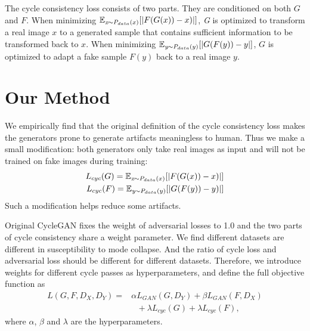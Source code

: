 \documentclass[letterpaper]{article} %
\newcommand{\zhiming}[1]{{\bf \color{blue} [Zhiming says: #1]}}
\begin{document}
	The cycle consistency loss consists of two parts. They are conditioned on both $G$ and $F$. When minimizing $\mathbb{E}_{\emph{x} \sim P_{data}(x)}[\lvert F(G(x))-x)\rvert]$, \emph{G} is optimized to transform a real image $x$ to a generated sample that contains sufficient information to be transformed back to $x$. When minimizing $\mathbb{E}_{\emph{y} \sim P_{data}(y)}[\lvert G(F(y))-y \rvert]$, $G$ is optimized to adapt a fake sample $F(y)$ back to a real image $y$. 
	
	\section{Our Method}
	
	We empirically find that the original definition of the cycle consistency loss  makes the generators prone to generate artifacts meaningless to human. Thus we make a small modification: both generators only take real images as input and will not be trained on fake images during training:
	\begin{align}
	L_{cyc}(G) = \mathbb{E}_{\emph{x} \sim P_{data}(x)}[\lvert F(G(x))-x)\rvert] \nonumber\\
	L_{cyc}(F) = \mathbb{E}_{\emph{y} \sim P_{data}(y)}[\lvert G(F(y))-y)\rvert]
	\end{align}
	Such a modification helps reduce some artifacts.
	
	Original CycleGAN fixes the weight of adversarial losses to 1.0 and the two parts of cycle consistency share a weight parameter. We find different datasets are different in susceptibility to mode collapse. And the ratio of cycle loss and adversarial loss should be different for different datasets. Therefore, we introduce weights for different cycle passes as hyperparameters, and define the full objective function as
	\begin{align}
	L(G,F,D_X,D_Y) = &\alpha L_{GAN}(G,D_Y) + \beta L_{GAN}(F,D_X) \nonumber\\
	&~~~+ \lambda L_{cyc}(G)  + \lambda L_{cyc}(F),
	\end{align}
	where $\alpha$, $\beta$ and $\lambda$ are the hyperparameters.
	
	
\end{document}
